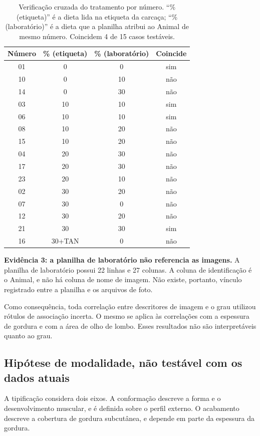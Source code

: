 \documentclass[12pt,a4paper]{article}
\begin{document}
\begin{table}[!ht]
\centering
\caption{Verificação cruzada do tratamento por número. ``\% (etiqueta)'' é a dieta lida
na etiqueta da carcaça; ``\% (laboratório)'' é a dieta que a planilha atribui ao Animal
de mesmo número. Coincidem 4 de 15 casos testáveis.}
\label{tab:cruz}
\begin{tabular}{cccc}
\toprule
Número & \% (etiqueta) & \% (laboratório) & Coincide \\
\midrule
01 & 0  & 0  & sim \\
10 & 0  & 10 & não \\
14 & 0  & 30 & não \\
03 & 10 & 10 & sim \\
06 & 10 & 10 & sim \\
08 & 10 & 20 & não \\
15 & 10 & 20 & não \\
04 & 20 & 30 & não \\
17 & 20 & 30 & não \\
23 & 20 & 10 & não \\
02 & 30 & 20 & não \\
07 & 30 & 0  & não \\
12 & 30 & 20 & não \\
21 & 30 & 30 & sim \\
16 & 30+TAN & 0 & não \\
\bottomrule
\end{tabular}
\end{table}

\textbf{Evidência 3: a planilha de laboratório não referencia as imagens.} A planilha de
laboratório possui 22 linhas e 27 colunas. A coluna de identificação é o Animal, e não
há coluna de nome de imagem. Não existe, portanto, vínculo registrado entre a planilha e
os arquivos de foto.

Como consequência, toda correlação entre descritores de imagem e o grau utilizou
rótulos de associação incerta. O mesmo se aplica às correlações com a espessura de
gordura e com a área de olho de lombo. Esses resultados não são interpretáveis quanto
ao grau.

\subsection{Hipótese de modalidade, não testável com os dados atuais}

A tipificação considera dois eixos. A conformação descreve a forma e o desenvolvimento
muscular, e é definida sobre o perfil externo. O acabamento descreve a cobertura de
gordura subcutânea, e depende em parte da espessura da gordura.
\end{document}
